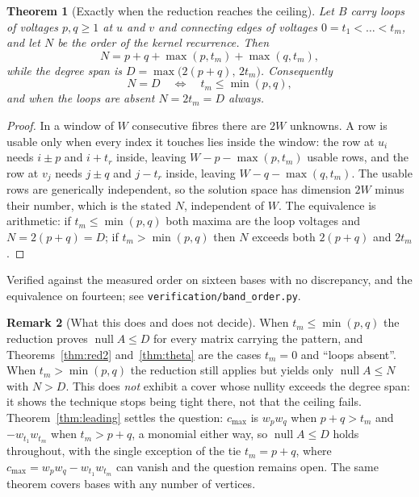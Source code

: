 \documentclass[11pt]{article}
\newtheorem{theorem}{Theorem}
\theoremstyle{definition}
\newtheorem{remark}[theorem]{Remark}
\begin{document}
\begin{theorem}[Exactly when the reduction reaches the ceiling]\label{thm:order}
Let $B$ carry loops of voltages $p,q\ge1$ at $u$ and $v$ and connecting edges of
voltages $0=t_1<\dots<t_m$, and let $N$ be the order of the kernel recurrence.
Then
\[
  N=p+q+\max(p,t_m)+\max(q,t_m),
\]
while the degree span is $D=\max\bigl(2(p+q),\,2t_m\bigr)$. Consequently
\[
  N=D\quad\Longleftrightarrow\quad t_m\le\min(p,q),
\]
and when the loops are absent $N=2t_m=D$ always.
\end{theorem}

\begin{proof}
In a window of $W$ consecutive fibres there are $2W$ unknowns. A row is usable
only when every index it touches lies inside the window: the row at $u_i$ needs
$i\pm p$ and $i+t_r$ inside, leaving $W-p-\max(p,t_m)$ usable rows, and the row
at $v_j$ needs $j\pm q$ and $j-t_r$ inside, leaving $W-q-\max(q,t_m)$. The
usable rows are generically independent, so the solution space has dimension
$2W$ minus their number, which is the stated $N$, independent of $W$. The
equivalence is arithmetic: if $t_m\le\min(p,q)$ both maxima are the loop
voltages and $N=2(p+q)=D$; if $t_m>\min(p,q)$ then $N$ exceeds both $2(p+q)$
and $2t_m$.
\end{proof}

\noindent
Verified against the measured order on sixteen bases with no discrepancy, and
the equivalence on fourteen; see \texttt{verification/band\_order.py}.

\begin{remark}[What this does and does not decide]
When $t_m\le\min(p,q)$ the reduction proves $\operatorname{null}A\le D$ for every
matrix carrying the pattern, and Theorems~\ref{thm:red2} and~\ref{thm:theta} are
the cases $t_m=0$ and ``loops absent''. When $t_m>\min(p,q)$ the reduction still
applies but yields only $\operatorname{null}A\le N$ with $N>D$. This does
\emph{not} exhibit a cover whose nullity exceeds the degree span: it shows the
technique stops being tight there, not that the ceiling fails.
Theorem~\ref{thm:leading} settles the question: $c_{\max}$ is $w_pw_q$ when
$p+q>t_m$ and $-w_{t_1}w_{t_m}$ when $t_m>p+q$, a monomial either way, so
$\operatorname{null}A\le D$ holds throughout, with the single exception of the
tie $t_m=p+q$, where $c_{\max}=w_pw_q-w_{t_1}w_{t_m}$ can vanish and the
question remains open. The same theorem covers bases with any number of
vertices.
\end{remark}
\end{document}
